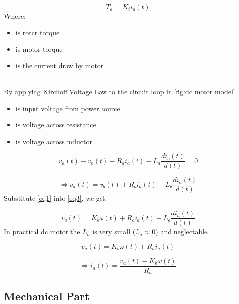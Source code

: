 \documentclass[12pt,a4paper]{article}
\begin{document}
	\begin{equation}
		T_a = K_t i_a(t)
		\label{eq2}
	\end{equation}
	Where:
	\begin{itemize}
		\item { is rotor torque }
		\item { is motor torque}
		\item { is the current draw by motor}
	\end{itemize}
	\hfill\\
	By applying Kirchoff Voltage Law to the circuit loop in \autoref{fig:dc motor model}
	\begin{itemize}
		\item { is input voltage from power source}
		\item { is voltage across resistance}
		\item { is voltage across inductor}
	\end{itemize}

	\[v_a(t) - v_b(t) - R_a i_a(t) - L_a \frac{di_a(t)}{d(t)} = 0\]
	
	\begin{equation}
		\Rightarrow v_a(t) = v_b(t) + R_a i_a(t) + L_a \frac{di_a(t)}{d(t)}
		\label{eq3}
	\end{equation}
	Substitute \autoref{eq1} into \autoref{eq3}, we get:
	
	\begin{equation}
		v_a(t) = K_b \omega(t) + R_a i_a(t) + L_a \frac{di_a(t)}{d(t)}
		\label{eq4}
	\end{equation}
	In practical dc motor the \(L_a\) is very small (\(L_a \approx 0\)) and neglectable.
	
	\[v_a(t) = K_b \omega(t) + R_a i_a(t)\]
	
	\begin{equation}
		\Rightarrow \boxed{i_a(t) = \frac{v_a(t) - K_b \omega(t)}{R_a}}
		\label{eq5}
	\end{equation}

	\subsection{Mechanical Part}
\end{document}
